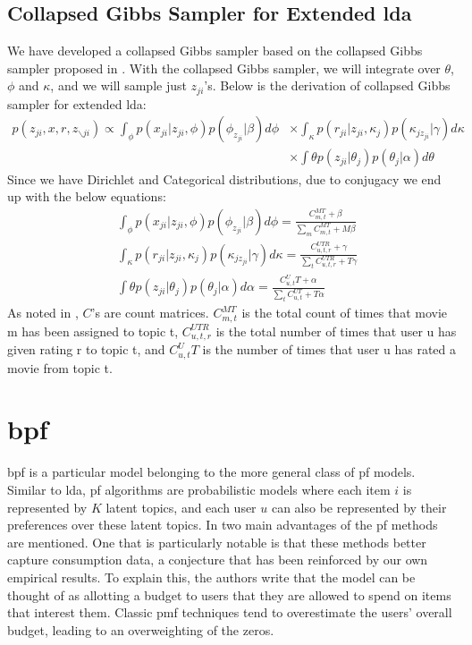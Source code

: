 \documentclass{article} %
\begin{document}
\subsection{Collapsed Gibbs Sampler for Extended \gls{lda}}
We have developed a collapsed Gibbs sampler based on the collapsed Gibbs sampler 
proposed in \cite{steyvers2007probabilistic}. With the collapsed Gibbs sampler, 
we will integrate over $\theta$, $\phi$ and $\kappa$, and we will sample just
$z_{ji}$'s. Below is the derivation of collapsed Gibbs sampler for extended 
\gls{lda}:
\begin{align*}
  p(z_{ji},x,r,z_{\backslash ji}) \propto 
  \int_{\phi} p(x_{ji}|z_{ji},\phi)p(\phi_{z_{ji}}|\beta)d\phi
  &\times \int_{\kappa} p(r_{ji}|z_{ji},\kappa_{j})p(\kappa_{jz_{ji}}|\gamma) d\kappa
  \\
  &\times \int{\theta} p(z_{ji}|\theta_{j})p(\theta_j|\alpha) d\theta
\end{align*}
Since we have Dirichlet and Categorical distributions, due to conjugacy we end 
up with the below equations:
\begin{align*}
  &\int_{\phi} p(x_{ji}|z_{ji},\phi)p(\phi_{z_{ji}}|\beta)d\phi = \frac{C_{m,t}^{MT}+\beta}{\sum_m C_{m,t}^{MT}+M\beta} 
  \\
  &\int_{\kappa} p(r_{ji}|z_{ji},\kappa_{j})p(\kappa_{jz_{ji}}|\gamma) d\kappa = \frac{C_{u,t,r}^{UTR}+\gamma}{\sum_t C_{u,t,r}^{UTR}+T\gamma} 
  \\
  &\int{\theta} p(z_{ji}|\theta_{j})p(\theta_j|\alpha) d\alpha = \frac{C_{u,t}^UT+\alpha}{\sum_t C_{u,t}^{UT}+T\alpha}
\end{align*}
As noted in \cite{steyvers2007probabilistic}, $C$'s are count matrices. $C_{m,t}^{MT}$ 
is the total count of times that movie m has been assigned to topic t, $C_{u,t,r}^{UTR}$ 
is the total number of times that user u has given rating r to topic t, and $C_{u,t}^UT$ 
is the number of times that user u has rated a movie from topic t. 

\section{\acrlong{bpf}}
\acrlong{bpf} is a particular model belonging to the more general class of \gls{pf} models. Similar to \gls{lda}, \gls{pf} algorithms are probabilistic models where each item $i$ is represented by $K$ latent topics, and each user $u$ can also be represented by their preferences over these latent topics. In \citep{gopalan2013scalable} two main advantages of the \gls{pf} methods are mentioned. One that is particularly notable is that these methods better capture consumption data, a conjecture that has been reinforced by our own empirical results. To explain this, the authors write that the model can be thought of as allotting a budget to users that they are allowed to spend on items that interest them. Classic \gls{pmf} techniques tend to overestimate the users' overall budget, leading to an overweighting of the zeros.
\end{document}

